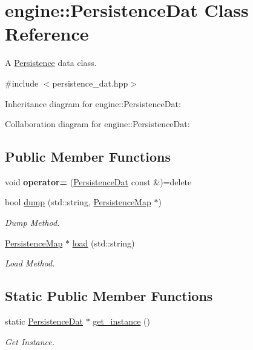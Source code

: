 \hypertarget{classengine_1_1_persistence_dat}{}\section{engine\+:\+:Persistence\+Dat Class Reference}
\label{classengine_1_1_persistence_dat}


A \hyperlink{classengine_1_1_persistence}{Persistence} data class.  




{\ttfamily \#include $<$persistence\+\_\+dat.\+hpp$>$}



Inheritance diagram for engine\+:\+:Persistence\+Dat\+:


Collaboration diagram for engine\+:\+:Persistence\+Dat\+:
\subsection*{Public Member Functions}
\begin{DoxyCompactItemize}
\item 
void {\bfseries operator=} (\hyperlink{classengine_1_1_persistence_dat}{Persistence\+Dat} const \&)=delete\hypertarget{classengine_1_1_persistence_dat_a207058814fa0d5cf6ab693eb6c2bcd58}{}\label{classengine_1_1_persistence_dat_a207058814fa0d5cf6ab693eb6c2bcd58}

\item 
bool \hyperlink{classengine_1_1_persistence_dat_a967c33fc78f68fb756b6d730f2fc38e0}{dump} (std\+::string, \hyperlink{classengine_1_1_persistence_map}{Persistence\+Map} $\ast$)
\begin{DoxyCompactList}\small\item\em Dump Method. \end{DoxyCompactList}\item 
\hyperlink{classengine_1_1_persistence_map}{Persistence\+Map} $\ast$ \hyperlink{classengine_1_1_persistence_dat_afd72460731bf0fab23f002ad0c895925}{load} (std\+::string)
\begin{DoxyCompactList}\small\item\em Load Method. \end{DoxyCompactList}\end{DoxyCompactItemize}
\subsection*{Static Public Member Functions}
\begin{DoxyCompactItemize}
\item 
static \hyperlink{classengine_1_1_persistence_dat}{Persistence\+Dat} $\ast$ \hyperlink{classengine_1_1_persistence_dat_a10d573b0dc2ac097d53b2e445625fe6f}{get\+\_\+instance} ()
\begin{DoxyCompactList}\small\item\em Get Instance. \end{DoxyCompactList}\end{DoxyCompactItemize}


